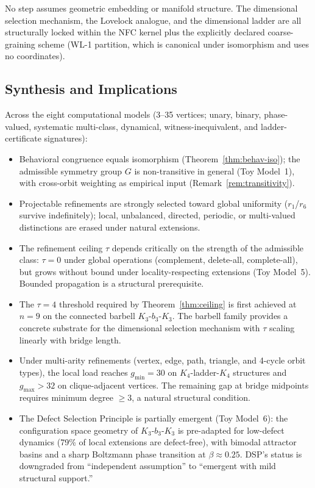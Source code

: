 \documentclass[11pt,a4paper]{article}
\theoremstyle{definition}
\theoremstyle{remark}
\begin{document}
No step assumes geometric embedding or manifold structure. The dimensional selection mechanism, the Lovelock analogue, and the dimensional ladder are all structurally locked within the NFC kernel plus the explicitly declared coarse-graining scheme (WL-1 partition, which is canonical under isomorphism and uses no coordinates).


\subsection{Synthesis and Implications}

Across the eight computational models (3--35 vertices; unary, binary, phase-valued, systematic multi-class, dynamical, witness-inequivalent, and ladder-certificate signatures):
\begin{itemize}[nosep]
  \item Behavioral congruence equals isomorphism (Theorem~\ref{thm:behav-iso}); the admissible symmetry group $G$ is non-transitive in general (Toy Model~1), with cross-orbit weighting as empirical input (Remark~\ref{rem:transitivity}).
  \item Projectable refinements are strongly selected toward global uniformity ($r_1$/$r_6$ survive indefinitely); local, unbalanced, directed, periodic, or multi-valued distinctions are erased under natural extensions.
  \item The refinement ceiling $\tau$ depends critically on the strength of the admissible class: $\tau = 0$ under global operations (complement, delete-all, complete-all), but grows without bound under locality-respecting extensions (Toy Model~5). Bounded propagation is a structural prerequisite.
  \item The $\tau = 4$ threshold required by Theorem~\ref{thm:ceiling} is first achieved at $n = 9$ on the connected barbell $K_3\text{-}b_3\text{-}K_3$. The barbell family provides a concrete substrate for the dimensional selection mechanism with $\tau$ scaling linearly with bridge length.
  \item Under multi-arity refinements (vertex, edge, path, triangle, and 4-cycle orbit types), the local load reaches $g_{\min} = 30$ on $K_4$-ladder-$K_4$ structures and $g_{\max} > 32$ on clique-adjacent vertices. The remaining gap at bridge midpoints requires minimum degree $\geq 3$, a natural structural condition.
  \item The Defect Selection Principle is partially emergent (Toy Model~6): the configuration space geometry of $K_3\text{-}b_3\text{-}K_3$ is pre-adapted for low-defect dynamics (79\% of local extensions are defect-free), with bimodal attractor basins and a sharp Boltzmann phase transition at $\beta \approx 0.25$. DSP's status is downgraded from ``independent assumption'' to ``emergent with mild structural support.''

\end{itemize}
\end{document}
